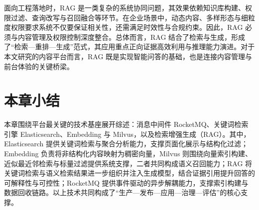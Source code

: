 面向工程落地时，RAG 是一类复杂的系统协同问题，其效果依赖知识库构建、权限过滤、查询改写与召回融合等环节。在企业场景中，动态内容、多样形态与细粒度权限要求系统不仅要保证相关性，还需满足时效性与合规约束。因此，RAG 必须与内容管理及权限控制深度整合。总体而言，RAG 结合了检索与生成，形成了“检索—重排—生成”范式，其应用重点正向证据高效利用与推理能力演进\cite{fan2024survey,yu2024rankrag,huang2025survey}。对于本文研究的内容平台而言，RAG 既是实现智能问答的基础，也是连接内容管理与前台体验的关键桥梁。

\section{本章小结}

本章围绕平台最关键的技术基座展开综述：消息中间件 RocketMQ、关键词检索引擎 Elasticsearch、Embedding 与 Milvus，以及检索增强生成（RAG）。其中，Elasticsearch 提供关键词检索与聚合分析能力，支撑页面化展示与结构化过滤；Embedding 负责将非结构化内容映射为稠密向量，Milvus 则围绕向量索引构建、近似最近邻检索与标量过滤提供系统支撑，二者共同构成语义召回能力；RAG 将关键词检索与语义检索结果进一步组织并注入生成模型，结合证据引用提升回答的可解释性与可控性；RocketMQ 提供事件驱动的异步解耦能力，支撑索引构建与数据回收链路。以上技术共同构成了“生产—发布—应用—治理—评估”的核心支撑。
